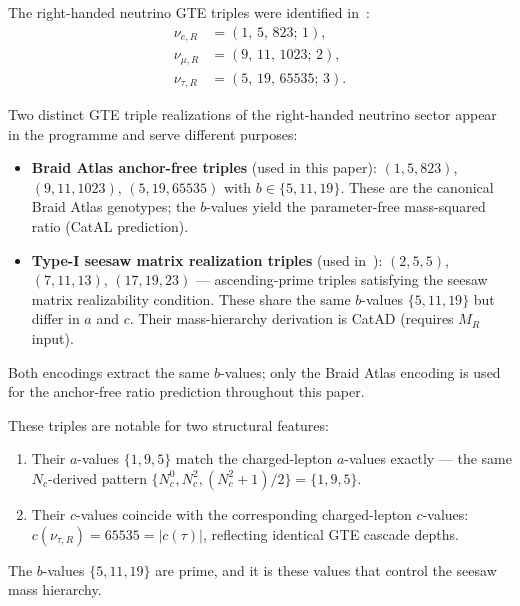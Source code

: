 \documentclass[12pt,a4paper]{article}
\theoremstyle{definition}
\theoremstyle{remark}
\begin{document}
The right-handed neutrino GTE triples were identified in~\cite{SpivackBraidAtlas}:
\begin{align*}
  \nu_{e,R} &= (1,\, 5,\, 823;\, 1), \\
  \nu_{\mu,R} &= (9,\, 11,\, 1023;\, 2), \\
  \nu_{\tau,R} &= (5,\, 19,\, 65535;\, 3).
\end{align*}

\begin{tcolorbox}[colback=blue!4!white,colframe=blue!50!black,
  title={\textbf{Note on right-handed neutrino encodings}},
  left=5pt,right=5pt,top=4pt,bottom=4pt]
Two distinct GTE triple realizations of the right-handed neutrino sector
appear in the programme and serve different purposes:
\begin{itemize}[leftmargin=1.2em,itemsep=0.15em]
  \item \textbf{Braid Atlas anchor-free triples} (used in this paper):
    $(1,5,823)$, $(9,11,1023)$, $(5,19,65535)$ with $b \in \{5,11,19\}$.
    These are the canonical Braid Atlas genotypes; the $b$-values
    yield the parameter-free mass-squared ratio (CatAL prediction).
  \item \textbf{Type-I seesaw matrix realization triples}
    (used in~\cite{Spivack2026_SM_UGP}):
    $(2,5,5)$, $(7,11,13)$, $(17,19,23)$ --- ascending-prime
    triples satisfying the seesaw matrix realizability condition.
    These share the same $b$-values $\{5,11,19\}$ but differ in $a$ and $c$.
    Their mass-hierarchy derivation is CatAD (requires $M_R$ input).
\end{itemize}
Both encodings extract the same $b$-values; only the Braid Atlas encoding
is used for the anchor-free ratio prediction throughout this paper.
\end{tcolorbox}

These triples are notable for two structural features:
\begin{enumerate}[leftmargin=1.5em,itemsep=0.15em]
  \item Their $a$-values $\{1, 9, 5\}$ match the charged-lepton $a$-values exactly
    --- the same $N_c$-derived pattern $\{N_c^0, N_c^2, (N_c^2+1)/2\} = \{1, 9, 5\}$.
  \item Their $c$-values coincide with the corresponding
    charged-lepton $c$-values: $c(\nu_{\tau,R}) = 65535 = |c(\tau)|$,
    reflecting identical GTE cascade depths.
\end{enumerate}
The $b$-values $\{5, 11, 19\}$ are prime, and it is these values
that control the seesaw mass hierarchy.
\end{document}

